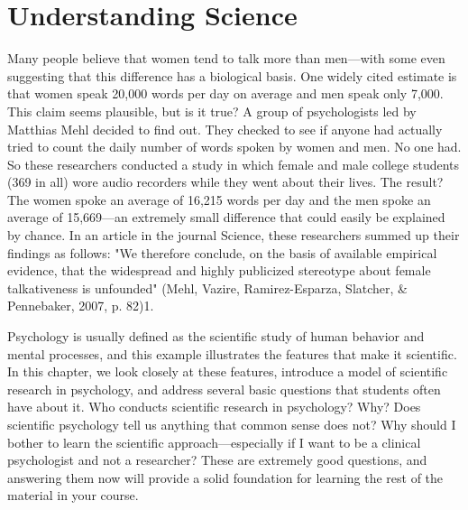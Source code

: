 



\section{Understanding Science}


Many people believe that women tend to talk more than men---with some even suggesting that this difference has a biological basis. One widely cited estimate is that women speak 20,000 words per day on average and men speak only 7,000. This claim seems plausible, but is it true? A group of psychologists led by Matthias Mehl decided to find out. They checked to see if anyone had actually tried to count the daily number of words spoken by women and men. No one had. So these researchers conducted a study in which female and male college students (369 in all) wore audio recorders while they went about their lives. The result? The women spoke an average of 16,215 words per day and the men spoke an average of 15,669---an extremely small difference that could easily be explained by chance. In an article in the journal Science, these researchers summed up their findings as follows: "We therefore conclude, on the basis of available empirical evidence, that the widespread and highly publicized stereotype about female talkativeness is unfounded" (Mehl, Vazire, Ramirez-Esparza, Slatcher, \& Pennebaker, 2007, p. 82)1.

Psychology is usually defined as the scientific study of human behavior and mental processes, and this example illustrates the features that make it scientific. In this chapter, we look closely at these features, introduce a model of scientific research in psychology, and address several basic questions that students often have about it. Who conducts scientific research in psychology? Why? Does scientific psychology tell us anything that common sense does not? Why should I bother to learn the scientific approach---especially if I want to be a clinical psychologist and not a researcher? These are extremely good questions, and answering them now will provide a solid foundation for learning the rest of the material in your course.

